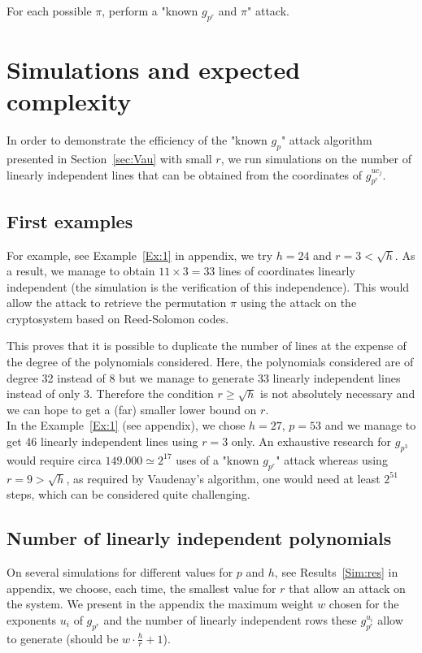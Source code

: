 \documentclass[a4paper]{article}
\begin{document}
For each possible $\pi$, perform a "known $g_{p^r}$ and $\pi$" attack.


\section{Simulations and expected complexity}
\label{sec:Simul}


In order to demonstrate the efficiency of the "known $g_p$" attack algorithm presented in Section~\ref{sec:Vau} with small $r$, we run simulations on the number of linearly independent lines that can be obtained from the coordinates of $g_{p^r}^{uc_j}$.


\subsection{First examples}

For example, see Example~\ref{Ex:1} in appendix, we try $h = 24$ and $r = 3 < \sqrt{h}$. As a result, we manage to obtain $11 \times 3 = 33$ lines of coordinates linearly independent (the simulation is the verification of this independence). This would allow the attack to retrieve the permutation $\pi$ using the attack on the cryptosystem based on Reed-Solomon codes.

This proves that it is possible to duplicate the number of lines at the expense of the degree of the polynomials considered. Here, the polynomials considered are of degree 32 instead of 8 but we manage to generate 33 linearly independent lines instead of only 3. Therefore the condition $r \geq \sqrt{h}$ is not absolutely necessary and we can hope to get a (far) smaller lower bound on $r$.\\

In the Example~\ref{Ex:1} (see appendix), we chose $h = 27$, $p = 53$ and we manage to get 46 linearly independent lines using $r = 3$ only.
An exhaustive research for $g_{p^3}$ would require circa $149.000 \simeq 2^17$ uses of a "known $g_{p^r}$" attack whereas using $r = 9 > \sqrt{h}$, as required by Vaudenay's algorithm, one would need at least $2^51$ steps, which can be considered quite challenging.\\


\subsection{Number of linearly independent polynomials}

On several simulations for different values for $p$ and $h$, see Results~\ref{Sim:res} in appendix, we choose, each time, the smallest value for $r$ that allow an attack on the system. We present in the appendix the maximum weight $w$ chosen for the exponents $u_i$ of $g_{p^r}$ and the number of linearly independent rows these $g_{p^r}^{u_i}$ allow to generate (should be $w\cdot \frac{h}{r} +1$).
\end{document}
